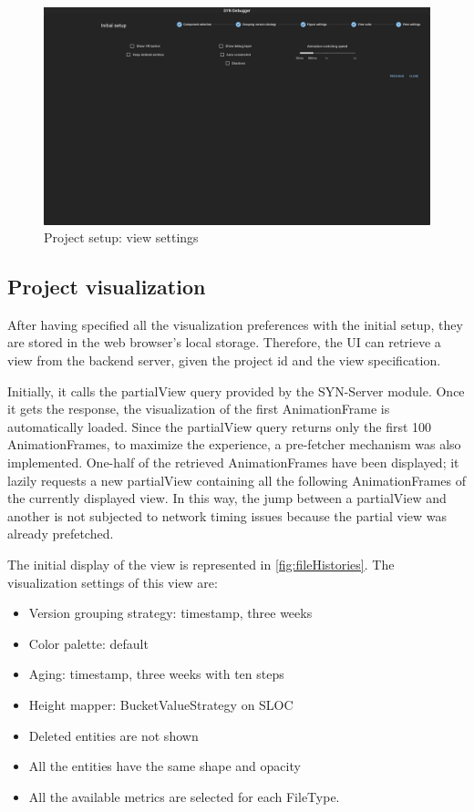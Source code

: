 \begin{figure}
    \center
    \includegraphics[width=\textwidth]{SYNUI-settings5.png}
    \caption{Project setup: view settings}
    \label{fig:SYNUIsettings5}
\end{figure}

\subsection*{Project visualization}
After having specified all the visualization preferences with the initial setup, they are stored in the web browser's local storage. 
Therefore, the UI can retrieve a view from the backend server, given the project id and the view specification. 

Initially, it calls the partialView query provided by the SYN-Server module. Once it gets the response, the visualization of the first AnimationFrame is automatically loaded. 
Since the partialView query returns only the first 100 AnimationFrames, to maximize the experience, a pre-fetcher mechanism was also implemented. 
One-half of the retrieved AnimationFrames have been displayed; it lazily requests a new partialView containing all the following AnimationFrames of the currently displayed view. 
In this way, the jump between a partialView and another is not subjected to network timing issues because the partial view was already prefetched. 


The initial display of the view is represented in \autoref{fig:fileHistories}. The visualization settings of this view are:
\begin{itemize}
    \item Version grouping strategy: timestamp, three weeks
    \item Color palette: default
    \item Aging: timestamp, three weeks with ten steps
    \item Height mapper: BucketValueStrategy on SLOC
    \item Deleted entities are not shown
    \item All the entities have the same shape and opacity
    \item All the available metrics are selected for each FileType. 
\end{itemize}

